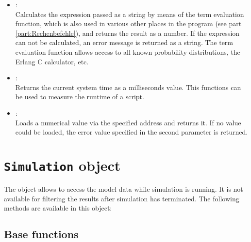 \begin{itemize}

\item
{}:\\
Calculates the expression passed as a string by means of the term evaluation function,
which is also used in various other places in the program (see part \ref{part:Rechenbefehle}),
and returns the result as a number. If the expression can not be calculated, an error message is returned as a string.
The term evaluation function allows access to all known probability distributions,
the Erlang C calculator, etc.

\item
{}:\\
Returns the current system time as a milliseconds value. This functions can be used to measure
the runtime of a script.

\item
{}:\\
Loads a numerical value via the specified address and returns it.
If no value could be loaded, the error value specified in the second parameter is returned.

\end{itemize}



\chapter{\texttt{Simulation} object}

The  object allows to access the model data while simulation is running.
It is not available for filtering the results after simulation has terminated.
The following methods are available in this object:

\section{Base functions}


